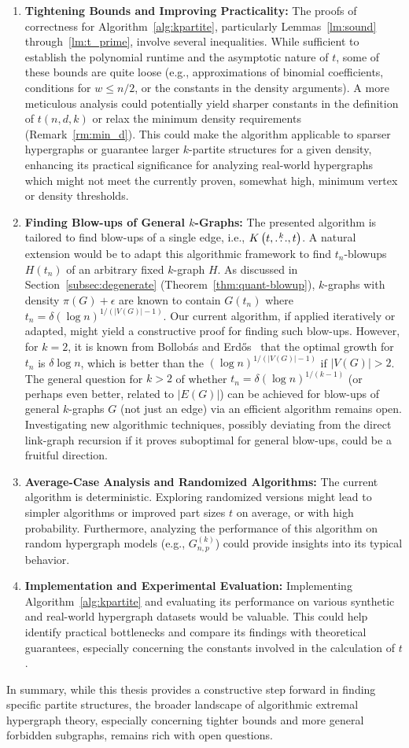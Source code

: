 \begin{enumerate}
    \item \textbf{Tightening Bounds and Improving Practicality:}
    The proofs of correctness for Algorithm~\ref{alg:kpartite}, particularly Lemmas~\ref{lm:sound} through~\ref{lm:t_prime}, involve several inequalities. While sufficient to establish the polynomial runtime and the asymptotic nature of $t$, some of these bounds are quite loose (e.g., approximations of binomial coefficients, conditions for $w \leq n/2$, or the constants in the density arguments). A more meticulous analysis could potentially yield sharper constants in the definition of $t(n,d,k)$ or relax the minimum density requirements (Remark~\ref{rm:min_d}). This could make the algorithm applicable to sparser hypergraphs or guarantee larger $k$-partite structures for a given density, enhancing its practical significance for analyzing real-world hypergraphs which might not meet the currently proven, somewhat high, minimum vertex or density thresholds.

    \item \textbf{Finding Blow-ups of General $k$-Graphs:}
    The presented algorithm is tailored to find blow-ups of a single edge, i.e., $K\left(t, \overset{k}{\dots}, t\right)$. A natural extension would be to adapt this algorithmic framework to find $t_n$-blowups $H(t_n)$ of an arbitrary fixed $k$-graph $H$. As discussed in Section~\ref{subsec:degenerate} (Theorem~\ref{thm:quant-blowup}), $k$-graphs with density $\pi(G) + \epsilon$ are known to contain $G(t_n)$ where $t_n = \delta (\log n)^{1/(|V(G)|-1)}$. Our current algorithm, if applied iteratively or adapted, might yield a constructive proof for finding such blow-ups.
    However, for $k=2$, it is known from Bollobás and Erd\H{o}s~\cite{bollobas1973structure} that the optimal growth for $t_n$ is $\delta \log n$, which is better than the $(\log n)^{1/(|V(G)|-1)}$ if $|V(G)| > 2$. The general question for $k > 2$ of whether $t_n = \delta (\log n)^{1/(k-1)}$ (or perhaps even better, related to $|E(G)|$) can be achieved for blow-ups of general $k$-graphs $G$ (not just an edge) via an efficient algorithm remains open. Investigating new algorithmic techniques, possibly deviating from the direct link-graph recursion if it proves suboptimal for general blow-ups, could be a fruitful direction.

    \item \textbf{Average-Case Analysis and Randomized Algorithms:}
    The current algorithm is deterministic. Exploring randomized versions might lead to simpler algorithms or improved part sizes $t$ on average, or with high probability. Furthermore, analyzing the performance of this algorithm on random hypergraph models (e.g., $G_{n,p}^{(k)}$) could provide insights into its typical behavior.

    \item \textbf{Implementation and Experimental Evaluation:}
    Implementing Algorithm~\ref{alg:kpartite} and evaluating its performance on various synthetic and real-world hypergraph datasets would be valuable. This could help identify practical bottlenecks and compare its findings with theoretical guarantees, especially concerning the constants involved in the calculation of $t$.
\end{enumerate}

In summary, while this thesis provides a constructive step forward in finding specific partite structures, the broader landscape of algorithmic extremal hypergraph theory, especially concerning tighter bounds and more general forbidden subgraphs, remains rich with open questions.
